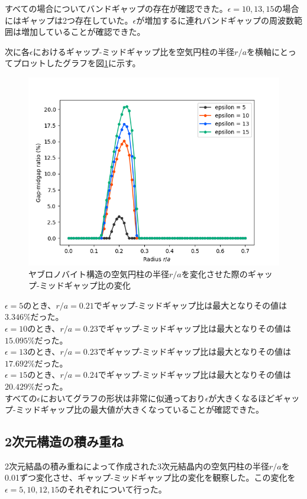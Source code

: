 \documentclass[platex,dvipdfmx]{jsreport}
\numberwithin{equation}{section}
\begin{document}
すべての場合についてバンドギャップの存在が確認できた。$\epsilon = 10, 13, 15$の場合にはギャップは2つ存在していた。$\epsilon$が増加するに連れバンドギャップの周波数範囲は増加していることが確認できた。

次に各$\epsilon$におけるギャップ-ミッドギャップ比を空気円柱の半径$r / a$を横軸にとってプロットしたグラフを図\ref{fig:yablonovite}に示す。 

\begin{figure}[htbp]
  \centering
  \includegraphics[width=0.8\linewidth]{results/gap_midgap_ratio/yablonovite.png}
  \caption{ヤブロノバイト構造の空気円柱の半径$r / a$を変化させた際のギャップ-ミッドギャップ比の変化}
  \label{fig:yablonovite}
\end{figure}

$\epsilon = 5$のとき、$r / a = 0.21$でギャップ-ミッドギャップ比は最大となりその値は$3.346 \%$だった。\\
$\epsilon = 10$のとき、$r / a = 0.23$でギャップ-ミッドギャップ比は最大となりその値は$15.095 \%$だった。\\
$\epsilon = 13$のとき、$r / a = 0.23$でギャップ-ミッドギャップ比は最大となりその値は$17.692 \%$だった。\\
$\epsilon = 15$のとき、$r / a = 0.24$でギャップ-ミッドギャップ比は最大となりその値は$20.429 \%$だった。\\



すべての$\epsilon$においてグラフの形状は非常に似通っており$\epsilon$が大きくなるほどギャップ-ミッドギャップ比の最大値が大きくなっていることが確認できた。\\


\clearpage

\subsection{2次元構造の積み重ね}
2次元結晶の積み重ねによって作成された3次元結晶内の空気円柱の半径$r / a$を0.01ずつ変化させ、ギャップ-ミッドギャップ比の変化を観察した。この変化を$\epsilon = 5, 10, 12, 15$のそれぞれについて行った。
\end{document}
